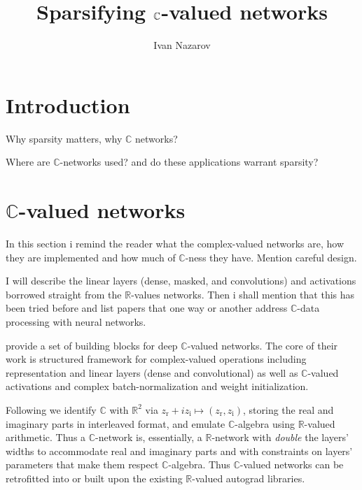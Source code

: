 \documentclass[a4paper,10pt]{article}
\title{Sparsifying $\cplx$-valued networks}
\author{Ivan Nazarov}
\newcommand{\real}{\mathbb{R}}
\newcommand{\cplx}{\mathbb{C}}
\begin{document}
\maketitle


\section{Introduction} %
\label{sec:introduction}

Why sparsity matters, why $\cplx$ networks?

Where are $\cplx$-networks used? and do these applications warrant sparsity?


\section{$\cplx$-valued networks} %
\label{sec:c_valued_networks}

In this section i remind the reader what the complex-valued networks are, how
they are implemented and how much of $\cplx$-ness they have. Mention careful
design.

I will describe the linear layers (dense, masked, and convolutions) and
activations borrowed straight from the $\real$-values networks. Then i shall
mention that this has been tried before and list papers that one way or another
address $\cplx$-data processing with neural networks.

\cite{trabelsi_deep_2017} provide a set of building blocks for deep $\cplx$-valued
networks. The core of their work is structured framework for complex-valued operations
including representation and linear layers (dense and convolutional) as well
as $\cplx$-valued activations and complex batch-normalization and weight initialization.

Following \cite{trabelsi_deep_2017} we identify $\cplx$ with $\real^2$ via $
  z_\mathrm{r} + i z_\mathrm{i} \mapsto (z_\mathrm{r}, z_\mathrm{i})
$, storing the real and imaginary parts in interleaved format, and emulate $\cplx$-algebra
using $\real$-valued arithmetic. Thus a $\cplx$-network is, essentially, a $\real$-network
with \textit{double} the layers' widths to accommodate real and imaginary parts and
with constraints on layers' parameters that make them respect $\cplx$-algebra. Thus
$\cplx$-valued networks can be retrofitted into or built upon the existing $\real$-valued
autograd libraries.
\end{document}

